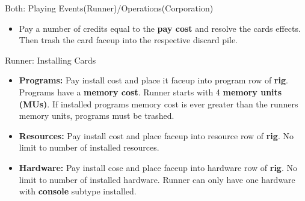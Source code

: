 \documentclass[12pt]{article}
\newenvironment{itemizeCustom}
{\begin{itemize}
  \setlength{\itemsep}{1pt}
  \setlength{\parskip}{0pt}
  \setlength{\parsep}{0pt}}
{\end{itemize}}
\begin{document}
\begin{multicols*}{2}
Both: Playing Events(Runner)/Operations(Corporation)
\begin{itemizeCustom}
	\item Pay a number of credits equal to the \textbf{pay cost} and resolve the cards effects. Then trash the card faceup into the respective discard pile.
\end{itemizeCustom}

Runner: Installing Cards
\begin{itemizeCustom}
	\item \textbf{Programs:} Pay install cost and place it faceup into program row of \textbf{rig}. Programs have a \textbf{memory cost}. Runner starts with 4 \textbf{memory units (MUs)}. If installed programs memory cost is ever greater than the runners memory units, programs must be trashed.
	\item \textbf{Resources:} Pay install cost and place faceup into resource row of \textbf{rig}. No limit to number of installed resources.
	\item \textbf{Hardware:} Pay install cose and place faceup into hardware row of \textbf{rig}. No limit to number of installed hardware. Runner can only have one hardware with \textbf{console} subtype installed.
\end{itemizeCustom}


\end{multicols*}
\end{document}
